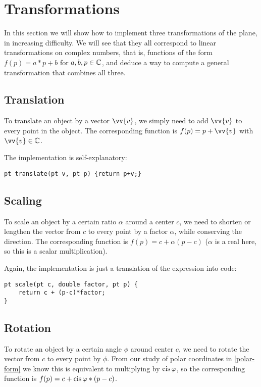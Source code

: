 \section{Transformations}
In this section we will show how to implement three transformations of the plane, in increasing difficulty. We will see that they all correspond to linear transformations on complex numbers, that is, functions of the form $f(p) = a \ast p + b$ for $a,b,p \in \mathbb{C}$, and deduce a way to compute a general transformation that combines all three.

\subsection{Translation}
To translate an object by a vector $\vv{v}$, we simply need to add $\vv{v}$ to every point in the object. The corresponding function is $f(p) = p + \vv{v}$ with $\vv{v} \in \complex$.


The implementation is self-explanatory:
\begin{lstlisting}
pt translate(pt v, pt p) {return p+v;}
\end{lstlisting}

\subsection{Scaling}
To scale an object by a certain ratio $\alpha$ around a center $c$, we need to shorten or lengthen the vector from $c$ to every point by a factor $\alpha$, while conserving the direction.
The corresponding function is $f(p) = c + \alpha(p-c)$ ($\alpha$ is a real here, so this is a scalar multiplication).


Again, the implementation is just a translation of the expression into code:
\begin{lstlisting}
pt scale(pt c, double factor, pt p) {
    return c + (p-c)*factor;
}
\end{lstlisting}

\subsection{Rotation}\label{ss:rotation}
To rotate an object by a certain angle $\phi$ around center $c$, we need to rotate the vector from $c$ to every point by $\phi$. From our study of polar coordinates in \ref{polar-form} we know this is equivalent to multiplying by $\operatorname{cis}\varphi$, so the corresponding function is $f(p) = c + \operatorname{cis}\varphi\ast(p-c)$.

